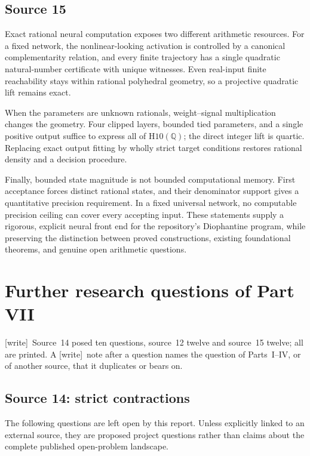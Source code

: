 \documentclass[11pt,letterpaper]{article}
\numberwithin{equation}{section}
\theoremstyle{definition}
\theoremstyle{remark}
\newcommand{\Q}{\mathbb Q}
\newcommand{\wtag}{\textup{[write]}}
\newcommand{\Hten}{\mathrm{H10}(\Q)}
\begin{document}
\subsection{Source 15}

Exact rational neural computation exposes two different arithmetic resources.
For a fixed network, the nonlinear-looking activation is controlled by a
canonical complementarity relation, and every finite trajectory has a
single quadratic natural-number certificate with unique witnesses. Even
real-input finite reachability stays within rational polyhedral geometry,
so a projective quadratic lift remains exact.

When the parameters are unknown rationals, weight--signal multiplication
changes the geometry. Four clipped layers, bounded tied parameters, and a
single positive output suffice to express all of $\Hten$; the direct
integer lift is quartic. Replacing exact output fitting by wholly strict
target conditions restores rational density and a decision procedure.

Finally, bounded state magnitude is not bounded computational memory.
First acceptance forces distinct rational states, and their denominator
support gives a quantitative precision requirement. In a fixed universal
network, no computable precision ceiling can cover every accepting input.
These statements supply a rigorous, explicit neural front end for the
repository's Diophantine program, while preserving the distinction between
proved constructions, existing foundational theorems, and genuine open
arithmetic questions.


\section{Further research questions of Part VII}
\label{pqc:conv:b62-VII:questions}
\wtag\ Source~14 posed ten questions, source~12 twelve and source~15 twelve; all
are printed. A \wtag\ note after a question names the question of Parts~I--IV,
or of another source, that it duplicates or bears on.

\subsection{Source 14: strict contractions}\label{pqc:sc:sec:questions}

The following questions are left open by this report. Unless explicitly
linked to an external source, they are proposed project questions rather
than claims about the complete published open-problem landscape.
\end{document}
